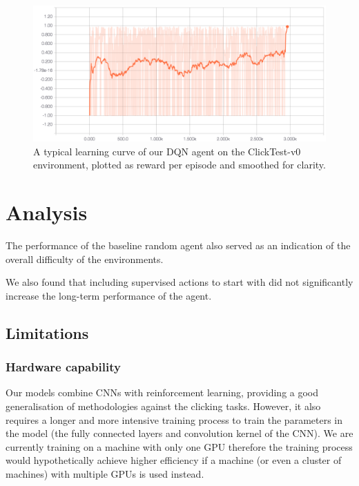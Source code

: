\documentclass[10pt,journal,compsoc]{IEEEtran}
\begin{document}
\begin{figure}[h!]
\centering
	\includegraphics[width=\columnwidth, keepaspectratio]{learningcurve.png}
	\caption{A typical learning curve of our DQN agent on the ClickTest-v0 environment, plotted as reward per episode and smoothed for clarity.}
	\label{fig:tboard}
\end{figure}




\section{Analysis}
The performance of the baseline random agent also served as an indication of the overall difficulty of the environments.

We also found that including supervised actions to start with did not significantly increase the long-term performance of the agent.

\subsection{Limitations}

\subsubsection{Hardware capability}
Our models combine CNNs with reinforcement learning, providing a good generalisation of methodologies against the clicking tasks. However, it also requires a longer and more intensive training process to train the parameters in the model (the fully connected layers and convolution kernel of the CNN). We are currently training on a machine with only one GPU therefore the training process would hypothetically achieve higher efficiency if a machine (or even a cluster of machines) with multiple GPUs is used instead.
\end{document}
